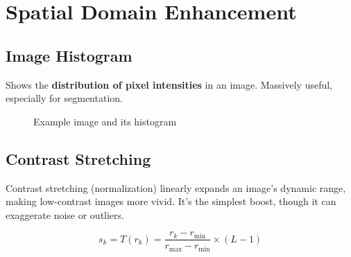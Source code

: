 \section*{Spatial Domain Enhancement}

\subsection*{Image Histogram}

Shows the \textbf{distribution of pixel intensities} in an image.
Massively useful, especially for segmentation.

\begin{figure}[H]
  \centering
  \caption{Example image and its histogram}
\end{figure}

\subsection*{Contrast Stretching}

Contrast stretching (normalization) linearly expands an image’s
dynamic range, making low-contrast images more vivid. It’s the
simplest boost, though it can exaggerate noise or outliers.

\begin{equation*}
  s_k = T(r_k)
  = \frac{r_k - r_{\min}}{r_{\max} - r_{\min}}
  \times (L - 1)
\end{equation*}

